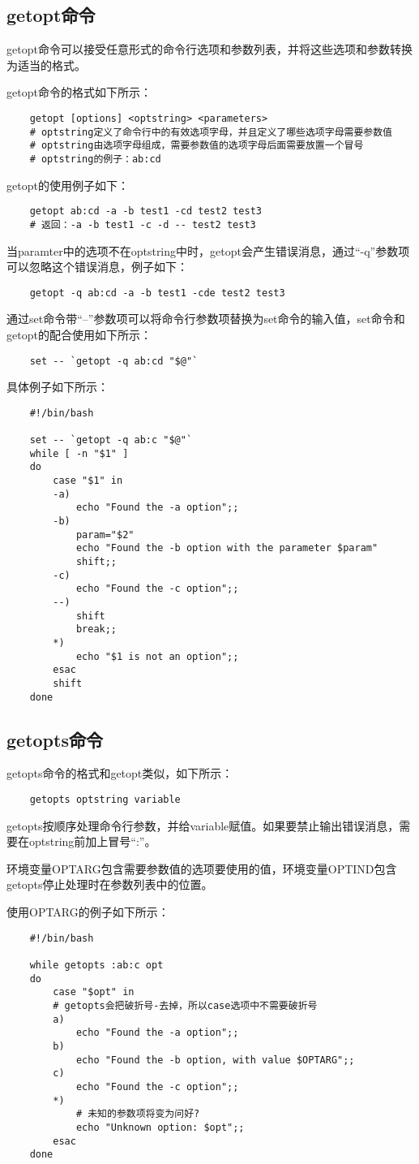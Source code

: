 \documentclass[a4paper,left=2.5cm,right=2.5cm,11pt]{article}
\begin{document}
\subsection{getopt命令}
	getopt命令可以接受任意形式的命令行选项和参数列表，并将这些选项和参数转换为适当的格式。\par
	getopt命令的格式如下所示：
	\begin{lstlisting}
	getopt [options] <optstring> <parameters>
	# optstring定义了命令行中的有效选项字母，并且定义了哪些选项字母需要参数值
	# optstring由选项字母组成，需要参数值的选项字母后面需要放置一个冒号
	# optstring的例子：ab:cd
	\end{lstlisting}

	getopt的使用例子如下：
	\begin{lstlisting}
	getopt ab:cd -a -b test1 -cd test2 test3
	# 返回：-a -b test1 -c -d -- test2 test3
	\end{lstlisting}

	当paramter中的选项不在optstring中时，getopt会产生错误消息，通过“-q”参数项可以忽略这个错误消息，例子如下：
	\begin{lstlisting}
	getopt -q ab:cd -a -b test1 -cde test2 test3
	\end{lstlisting}

	通过set命令带“--”参数项可以将命令行参数项替换为set命令的输入值，set命令和getopt的配合使用如下所示：
	\begin{lstlisting}
	set -- `getopt -q ab:cd "$@"`
	\end{lstlisting}

	具体例子如下所示：
	\begin{lstlisting}
	#!/bin/bash

	set -- `getopt -q ab:c "$@"`
	while [ -n "$1" ]
	do
		case "$1" in
		-a)
			echo "Found the -a option";;
		-b)
			param="$2"
			echo "Found the -b option with the parameter $param"
			shift;;
		-c)
			echo "Found the -c option";;
		--)
			shift
			break;;
		*)
			echo "$1 is not an option";;
		esac
		shift
	done
	\end{lstlisting}

\subsection{getopts命令}
	getopts命令的格式和getopt类似，如下所示：
	\begin{lstlisting}
	getopts optstring variable
	\end{lstlisting}

	getopts按顺序处理命令行参数，并给variable赋值。如果要禁止输出错误消息，需要在optstring前加上冒号“:”。\par
	环境变量OPTARG包含需要参数值的选项要使用的值，环境变量OPTIND包含getopts停止处理时在参数列表中的位置。\par
	使用OPTARG的例子如下所示：
	\begin{lstlisting}
	#!/bin/bash

	while getopts :ab:c opt
	do
		case "$opt" in
		# getopts会把破折号-去掉，所以case选项中不需要破折号
		a)
			echo "Found the -a option";;
		b) 
			echo "Found the -b option, with value $OPTARG";;
		c)
			echo "Found the -c option";;
		*)
			# 未知的参数项将变为问好?
			echo "Unknown option: $opt";;
		esac
	done
	\end{lstlisting}
\end{document}

